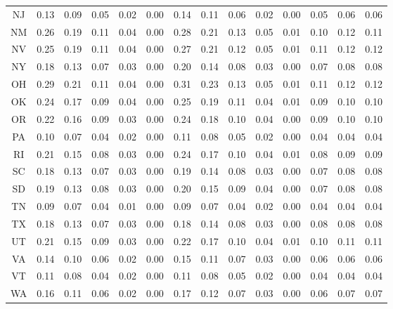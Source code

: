\begin{table}
\begin{tabular}{cccccccccccccc}
   NJ &  0.13 &  0.09 &  0.05 &  0.02 &  0.00 &  0.14 &  0.11 &  0.06 &  0.02 &  0.00 &    0.05 &     0.06 &      0.06 \\
   NM &  0.26 &  0.19 &  0.11 &  0.04 &  0.00 &  0.28 &  0.21 &  0.13 &  0.05 &  0.01 &    0.10 &     0.12 &      0.11 \\
   NV &  0.25 &  0.19 &  0.11 &  0.04 &  0.00 &  0.27 &  0.21 &  0.12 &  0.05 &  0.01 &    0.11 &     0.12 &      0.12 \\
   NY &  0.18 &  0.13 &  0.07 &  0.03 &  0.00 &  0.20 &  0.14 &  0.08 &  0.03 &  0.00 &    0.07 &     0.08 &      0.08 \\
   OH &  0.29 &  0.21 &  0.11 &  0.04 &  0.00 &  0.31 &  0.23 &  0.13 &  0.05 &  0.01 &    0.11 &     0.12 &      0.12 \\
   OK &  0.24 &  0.17 &  0.09 &  0.04 &  0.00 &  0.25 &  0.19 &  0.11 &  0.04 &  0.01 &    0.09 &     0.10 &      0.10 \\
   OR &  0.22 &  0.16 &  0.09 &  0.03 &  0.00 &  0.24 &  0.18 &  0.10 &  0.04 &  0.00 &    0.09 &     0.10 &      0.10 \\
   PA &  0.10 &  0.07 &  0.04 &  0.02 &  0.00 &  0.11 &  0.08 &  0.05 &  0.02 &  0.00 &    0.04 &     0.04 &      0.04 \\
   RI &  0.21 &  0.15 &  0.08 &  0.03 &  0.00 &  0.24 &  0.17 &  0.10 &  0.04 &  0.01 &    0.08 &     0.09 &      0.09 \\
   SC &  0.18 &  0.13 &  0.07 &  0.03 &  0.00 &  0.19 &  0.14 &  0.08 &  0.03 &  0.00 &    0.07 &     0.08 &      0.08 \\
   SD &  0.19 &  0.13 &  0.08 &  0.03 &  0.00 &  0.20 &  0.15 &  0.09 &  0.04 &  0.00 &    0.07 &     0.08 &      0.08 \\
   TN &  0.09 &  0.07 &  0.04 &  0.01 &  0.00 &  0.09 &  0.07 &  0.04 &  0.02 &  0.00 &    0.04 &     0.04 &      0.04 \\
   TX &  0.18 &  0.13 &  0.07 &  0.03 &  0.00 &  0.18 &  0.14 &  0.08 &  0.03 &  0.00 &    0.08 &     0.08 &      0.08 \\
   UT &  0.21 &  0.15 &  0.09 &  0.03 &  0.00 &  0.22 &  0.17 &  0.10 &  0.04 &  0.01 &    0.10 &     0.11 &      0.11 \\
   VA &  0.14 &  0.10 &  0.06 &  0.02 &  0.00 &  0.15 &  0.11 &  0.07 &  0.03 &  0.00 &    0.06 &     0.06 &      0.06 \\
   VT &  0.11 &  0.08 &  0.04 &  0.02 &  0.00 &  0.11 &  0.08 &  0.05 &  0.02 &  0.00 &    0.04 &     0.04 &      0.04 \\
   WA &  0.16 &  0.11 &  0.06 &  0.02 &  0.00 &  0.17 &  0.12 &  0.07 &  0.03 &  0.00 &    0.06 &     0.07 &      0.07 \\

\end{tabular}
\end{table}
